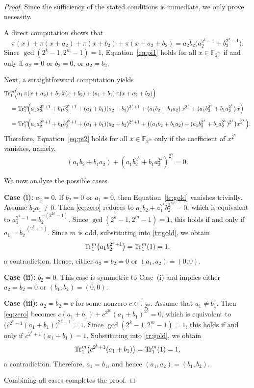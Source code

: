 \documentclass[12pt]{article}
\theoremstyle{plain}
\theoremstyle{definition}
\newcommand{\Tr}{{\rm Tr}}
\begin{document}
	\begin{proof}
		Since the sufficiency of the stated conditions is immediate, we only prove necessity.
		
		A direct computation shows that
		\[
		\pi(x)+\pi(x+a_2)+\pi(x+b_2)+\pi(x+a_2+b_2)
		= a_2 b_2 \bigl(a_2^{2^k-1}+b_2^{2^k-1}\bigr).
		\]
		Since $\gcd(2^k-1,2^m-1)=1$, Equation~\eqref{eq:pi1} holds for all
		$x\in\mathbb{F}_{2^m}$ if and only if \(a_2=0\) or \(b_2=0\), or \(a_2=b_2\).
		
		Next, a straightforward computation yields
		\begin{align}\label{tr:gold}
			&\Tr_{1}^{m}\!\Bigl(
			a_{1}\,\pi(x+a_{2})
			+ b_{1}\,\pi(x+b_{2})
			+ (a_{1}+b_{1})\,\pi(x+a_{2}+b_{2})
			\Bigr) \nonumber \\[4pt]
			&\quad = \Tr_{1}^{m}\!\Bigl(
			a_1 a_2^{2^k+1}
			+ b_1 b_2^{2^k+1}
			+ (a_1+b_1)(a_2+b_2)^{2^k+1} 
			+ (a_1 b_2 + b_1 a_2)\,x^{2^k}
			+ (a_1 b_2^{2^k} + b_1 a_2^{2^k})\,x
			\Bigr)   \nonumber  \\[4pt]
			&\quad = \Tr_{1}^{m}\!\Bigl(
			a_1 a_2^{2^k+1}
			+ b_1 b_2^{2^k+1}
			+ (a_1+b_1)(a_2+b_2)^{2^k+1} 
			+ \bigl(
			(a_1 b_2 + b_1 a_2)
			+ (a_1 b_2^{2^k} + b_1 a_2^{2^k})^{2^k}
			\bigr)x^{2^k}
			\Bigr).
		\end{align}
		Therefore, Equation~\eqref{eq:pi2} holds for all $x\in\mathbb{F}_{2^m}$ only if
		the coefficient of $x^{2^k}$ vanishes, namely,
		\begin{equation}\label{eq:zero}
			(a_1 b_2 + b_1 a_2)
			+ (a_1 b_2^{2^k} + b_1 a_2^{2^k})^{2^k} = 0.
		\end{equation}
		
		We now analyze the possible cases.
		
		\medskip
		\noindent\textbf{Case (i):} $a_2=0$.
		If $b_2=0$ or $a_1=0$, then Equation~\eqref{tr:gold} vanishes trivially.
		Assume $b_2 a_1\neq 0$. Then \eqref{eq:zero} reduces to $a_1 b_2 + a_1^{2^k} b_2^{2^{2k}}=0$,
		which is equivalent to $a_1^{2^k-1} = b_2^{-(2^{2k}-1)}$.
		Since $\gcd(2^k-1,2^m-1)=1$, this holds if and only if
		$a_1=b_2^{-(2^k+1)}$. Since $m$ is odd, substituting into \eqref{tr:gold}, we obtain
		\[
		\Tr_{1}^{m}\bigl(a_1 b_2^{2^k+1}\bigr)=\Tr_{1}^{m}(1)=1,
		\]
		a contradiction. Hence, either $a_2=b_2=0$ or $(a_1,a_2)=(0,0)$.
		
		\medskip
		\noindent\textbf{Case (ii):} $b_2=0$.
		This case is symmetric to Case~(i) and implies either $a_2=b_2=0$ or $(b_1,b_2)=(0,0)$.
		
		\medskip
		\noindent\textbf{Case (iii):} $a_2=b_2=c$ for some nonzero $c\in\mathbb{F}_{2^m}$.
		Assume that $a_1\neq b_1$. Then \eqref{eq:zero} becomes
		$c(a_1+b_1) + c^{2^{2k}}(a_1+b_1)^{2^k}=0$,
		which is equivalent to
		$\bigl(c^{2^k+1}(a_1+b_1)\bigr)^{2^k-1}=1$.
		Since $\gcd(2^k-1,2^m-1)=1$, this holds if and only if
		$c^{2^k+1}(a_1+b_1)=1$. Substituting into \eqref{tr:gold}, we obtain
		\[
		\Tr_{1}^{m}\bigl(c^{2^k+1}(a_1+b_1)\bigr)
		= \Tr_{1}^{m}(1)=1,
		\]
		a contradiction. Therefore, $a_1=b_1$, and hence $(a_1,a_2)=(b_1,b_2)$.
		
		\medskip
		Combining all cases completes the proof.
	\end{proof}
	
\end{document}

